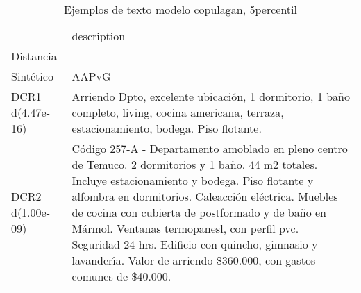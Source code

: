 \begin{table}[H]
\centering
\fontsize{10}{14}\selectfont
\caption{Ejemplos de texto modelo copulagan, 5percentil}
\label{table-example-economicos-b-2-copulagan-5p-text}
\begin{tabular}{|l|m{35em}|}
\hline
\rowcolor[gray]{0.8}
 & description \\
Distancia &  \\
\hline Sintético & AAPvG \\
\hline DCR1 d(4.47e-16) & Arriendo Dpto, excelente ubicaci\'on, 1 dormitorio, 1 ba\~no completo, living, cocina americana, terraza, estacionamiento, bodega. Piso flotante.   \\
\hline DCR2 d(1.00e-09) & C\'odigo 257-A - Departamento amoblado en pleno centro de Temuco. 2 dormitorios y 1 ba\~no. 44 m2 totales. Incluye estacionamiento y bodega. Piso flotante y alfombra en dormitorios. Caleacci\'on el\'ectrica. Muebles de cocina con cubierta de postformado y de ba\~no en M\'armol. Ventanas termopanesl, con perfil pvc. Seguridad 24 hrs. Edificio con quincho, gimnasio y lavander{\'\i}a. Valor de arriendo \$360.000, con gastos comunes de \$40.000. \\
\hline
\end{tabular}
\end{table}
